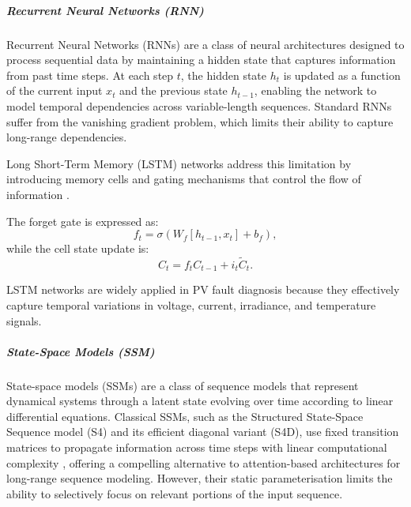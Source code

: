 \subparagraph{Recurrent Neural Networks (RNN)}

Recurrent Neural Networks (RNNs) are a class of neural architectures designed to process sequential data by maintaining a hidden state that captures information from past time steps. At each step $t$, the hidden state $h_t$ is updated as a function of the current input $x_t$ and the previous state $h_{t-1}$, enabling the network to model temporal dependencies across variable-length sequences. Standard RNNs suffer from the vanishing gradient problem, which limits their ability to capture long-range dependencies.

Long Short-Term Memory (LSTM) networks address this limitation by introducing memory cells and gating mechanisms that control the flow of information \citep{hochreiter1997lstm}.

The forget gate is expressed as:
\begin{equation}
f_t=\sigma(W_f[h_{t-1},x_t]+b_f),
\end{equation}
while the cell state update is:
\begin{equation}
C_t=f_tC_{t-1}+i_t\tilde{C}_t.
\end{equation}

LSTM networks are widely applied in PV fault diagnosis because they effectively capture temporal variations in voltage, current, irradiance, and temperature signals.

\subparagraph{State-Space Models (SSM)}
\label{sec:bg-mamba}

State-space models (SSMs) are a class of sequence models that represent dynamical systems through a latent state evolving over time according to linear differential equations. Classical SSMs, such as the Structured State-Space Sequence model (S4) and its efficient diagonal variant (S4D), use fixed transition matrices to propagate information across time steps with linear computational complexity \citep{gu2022s4}, offering a compelling alternative to attention-based architectures for long-range sequence modeling. However, their static parameterisation limits the ability to selectively focus on relevant portions of the input sequence.

